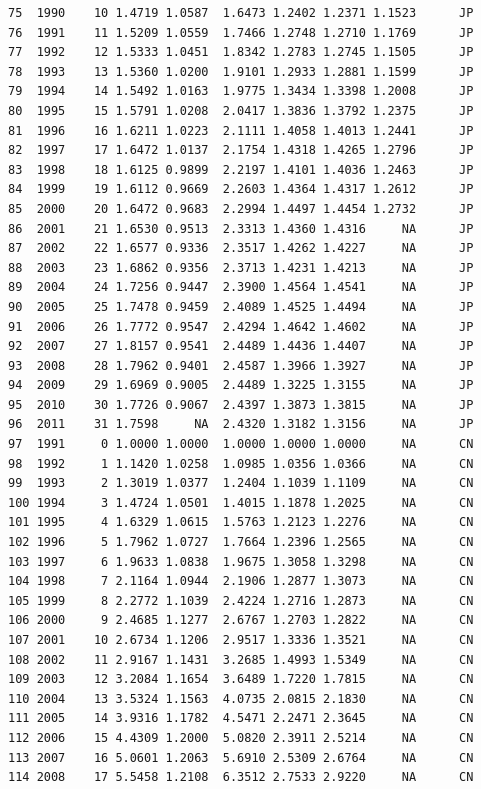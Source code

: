 \documentclass[preprint,authoryear,12pt]{elsarticle}\usepackage{graphicx, color}
\makeatletter
\newenvironment{kframe}{%
 \def\at@end@of@kframe{}%
 \ifinner\ifhmode%
  \def\at@end@of@kframe{\end{minipage}}%
  \begin{minipage}{\columnwidth}%
 \fi\fi%
 \def\FrameCommand##1{\hskip\@totalleftmargin \hskip-\fboxsep
 \colorbox{shadecolor}{##1}\hskip-\fboxsep
     \hskip-\linewidth \hskip-\@totalleftmargin \hskip\columnwidth}%
 \MakeFramed {\advance\hsize-\width
   \@totalleftmargin\z@ \linewidth\hsize
   \@setminipage}}%
 {\par\unskip\endMakeFramed%
 \at@end@of@kframe}
\newenvironment{knitrout}{}{} %
\makeatother
\begin{document}
\begin{knitrout}
\begin{kframe}
\begin{verbatim}
75  1990    10 1.4719 1.0587  1.6473 1.2402 1.2371 1.1523      JP
76  1991    11 1.5209 1.0559  1.7466 1.2748 1.2710 1.1769      JP
77  1992    12 1.5333 1.0451  1.8342 1.2783 1.2745 1.1505      JP
78  1993    13 1.5360 1.0200  1.9101 1.2933 1.2881 1.1599      JP
79  1994    14 1.5492 1.0163  1.9775 1.3434 1.3398 1.2008      JP
80  1995    15 1.5791 1.0208  2.0417 1.3836 1.3792 1.2375      JP
81  1996    16 1.6211 1.0223  2.1111 1.4058 1.4013 1.2441      JP
82  1997    17 1.6472 1.0137  2.1754 1.4318 1.4265 1.2796      JP
83  1998    18 1.6125 0.9899  2.2197 1.4101 1.4036 1.2463      JP
84  1999    19 1.6112 0.9669  2.2603 1.4364 1.4317 1.2612      JP
85  2000    20 1.6472 0.9683  2.2994 1.4497 1.4454 1.2732      JP
86  2001    21 1.6530 0.9513  2.3313 1.4360 1.4316     NA      JP
87  2002    22 1.6577 0.9336  2.3517 1.4262 1.4227     NA      JP
88  2003    23 1.6862 0.9356  2.3713 1.4231 1.4213     NA      JP
89  2004    24 1.7256 0.9447  2.3900 1.4564 1.4541     NA      JP
90  2005    25 1.7478 0.9459  2.4089 1.4525 1.4494     NA      JP
91  2006    26 1.7772 0.9547  2.4294 1.4642 1.4602     NA      JP
92  2007    27 1.8157 0.9541  2.4489 1.4436 1.4407     NA      JP
93  2008    28 1.7962 0.9401  2.4587 1.3966 1.3927     NA      JP
94  2009    29 1.6969 0.9005  2.4489 1.3225 1.3155     NA      JP
95  2010    30 1.7726 0.9067  2.4397 1.3873 1.3815     NA      JP
96  2011    31 1.7598     NA  2.4320 1.3182 1.3156     NA      JP
97  1991     0 1.0000 1.0000  1.0000 1.0000 1.0000     NA      CN
98  1992     1 1.1420 1.0258  1.0985 1.0356 1.0366     NA      CN
99  1993     2 1.3019 1.0377  1.2404 1.1039 1.1109     NA      CN
100 1994     3 1.4724 1.0501  1.4015 1.1878 1.2025     NA      CN
101 1995     4 1.6329 1.0615  1.5763 1.2123 1.2276     NA      CN
102 1996     5 1.7962 1.0727  1.7664 1.2396 1.2565     NA      CN
103 1997     6 1.9633 1.0838  1.9675 1.3058 1.3298     NA      CN
104 1998     7 2.1164 1.0944  2.1906 1.2877 1.3073     NA      CN
105 1999     8 2.2772 1.1039  2.4224 1.2716 1.2873     NA      CN
106 2000     9 2.4685 1.1277  2.6767 1.2703 1.2822     NA      CN
107 2001    10 2.6734 1.1206  2.9517 1.3336 1.3521     NA      CN
108 2002    11 2.9167 1.1431  3.2685 1.4993 1.5349     NA      CN
109 2003    12 3.2084 1.1654  3.6489 1.7220 1.7815     NA      CN
110 2004    13 3.5324 1.1563  4.0735 2.0815 2.1830     NA      CN
111 2005    14 3.9316 1.1782  4.5471 2.2471 2.3645     NA      CN
112 2006    15 4.4309 1.2000  5.0820 2.3911 2.5214     NA      CN
113 2007    16 5.0601 1.2063  5.6910 2.5309 2.6764     NA      CN
114 2008    17 5.5458 1.2108  6.3512 2.7533 2.9220     NA      CN

\end{verbatim}
\end{kframe}
\end{knitrout}
\end{document}
